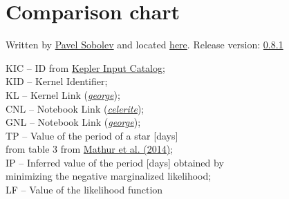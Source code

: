 \documentclass[12pt]{article}
\newcommand{\blank}[1]{\hspace*{#1}}
\begin{document}
\pagestyle{empty}

\section*{\hypertarget{sec:comparison}{Comparison chart}}

\fontsize{5}{4}\selectfont Written by \href{https://github.com/Paveloom/}{Pavel Sobolev} and located \href{https://github.com/Paveloom/C2}{here}. Release version: \href{https://github.com/Paveloom/C2/releases/tag/v0.8.1}{0.8.1} \par
\vspace{3pt}


\fontsize{4}{3}\selectfont
KIC -- ID from \href{https://archive.stsci.edu/kepler/data_search/search.php}{Kepler Input Catalog}; \\
KID -- Kernel Identifier; \\
KL -- Kernel Link (\href{https://george.readthedocs.io/en/latest/}{\textit{george}}); \\
CNL -- Notebook Link (\href{https://celerite.readthedocs.io/}{\textit{celerite}}); \\
GNL -- Notebook Link (\href{https://george.readthedocs.io/en/latest/}{\textit{george}}); \\
TP -- Value of the period of a star [days] \\
\blank{12pt} from table 3 from \href{https://paveloom.github.io/Paveloom/Repositories/C2/2/Mathur%20et%20al.%20(2014).pdf}{Mathur et al. (2014)}; \\
IP -- Inferred value of the period [days] obtained by \\
\blank{10pt} minimizing the negative marginalized likelihood; \\
LF -- Value of the likelihood function \par

\vspace{5pt}
\end{document}
